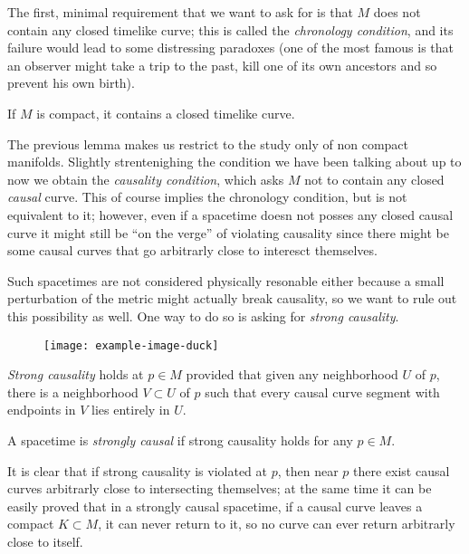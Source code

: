 The first, minimal requirement that we want to ask for is that \(M\) does not contain any  closed timelike curve; this is called the \emph{chronology condition}, and its failure would lead to some distressing paradoxes (one of the most famous is that an observer might take a trip to the past, kill one of its own ancestors and so prevent his own birth).

\begin{lemma}
	If \(M\) is compact, it contains a closed timelike curve.
\end{lemma}
The previous lemma makes us restrict to the study only of non compact manifolds.
Slightly strentenighing the condition we have been talking about up to now we obtain the \emph{causality condition}, which asks \(M\) not to contain any closed \emph{causal} curve. This of course implies the chronology condition, but is not equivalent to it; however, even if a spacetime doesn not posses any closed causal curve it might still be ``on the verge'' of violating causality since there might be some causal curves that go arbitrarly close to interesct themselves.

Such spacetimes are not considered physically resonable either because a small perturbation of the metric might actually break causality, so we want to rule out this possibility as well. One way to do so is asking for \emph{strong causality}.
\begin{figure}
	\centering
	\texttt{[image: example-image-duck]}
\end{figure}
\begin{definition}
	\emph{Strong causality} holds at \(p\in M\) provided that given any neighborhood \(U\) of \(p\), there is a neighborhood \(V\subset U\) of \(p\) such that every causal curve segment with endpoints in \(V\) lies entirely in \(U\).

	A spacetime is \emph{strongly causal} if strong causality holds for any \(p\in M\).
\end{definition}

	It is clear that if strong causality is violated at \(p\), then near \(p\) there exist causal curves arbitrarly close to intersecting themselves; at the same time it can be easily proved that in a strongly causal spacetime, if a causal curve leaves a compact \(K\subset M\), it can never return to it, so no curve can ever return arbitrarly close to itself.

